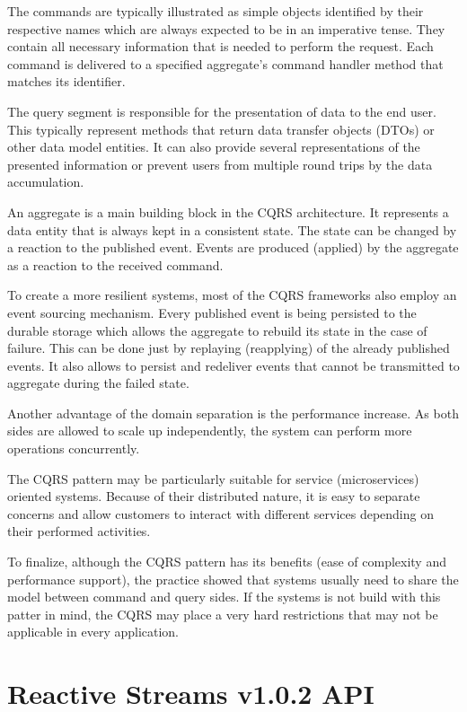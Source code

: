 \documentclass[oneside,
  digital, %
  table,   %
  nolof,     %
  nolot,     %
]{fithesis3}
\begin{document}
The commands are typically illustrated as simple objects identified by their respective names which are always expected to be in an imperative tense. They contain all necessary information that is needed to perform the request. Each command is delivered to a specified aggregate's command handler method that matches its identifier. 

The query segment is responsible for the presentation of data to the end user. This typically represent methods that return data transfer objects (DTOs) or other data model entities. It can also provide several representations of the presented information or prevent users from multiple round trips by the data accumulation.

An aggregate is a main building block in the CQRS architecture. It represents a data entity that is always kept in a consistent state. The state can be changed by a reaction to the published event. Events are produced (applied) by the aggregate as a reaction to the received command. 

To create a more resilient systems, most of the CQRS frameworks also employ an event sourcing mechanism. Every published event is being persisted to the durable storage which allows the aggregate to rebuild its state in the case of failure. This can be done just by replaying (reapplying) of the already published events. It also allows to persist and redeliver events that cannot be transmitted to aggregate during the failed state.

Another advantage of the domain separation is the performance increase. As both sides are allowed to scale up independently, the system can perform more operations concurrently.

The CQRS pattern may be particularly suitable for service (microservices) oriented systems. Because of their distributed nature, it is easy to separate concerns and allow customers to interact with different services depending on their performed activities.

To finalize, although the CQRS pattern has its benefits (ease of complexity and performance support), the practice showed that systems usually need to share the model between command and query sides. If the systems is not build with this patter in mind, the CQRS may place a very hard restrictions that may not be applicable in every application.


\chapter{Reactive Streams v1.0.2 API}
\label{reactive_streams}
\end{document}
